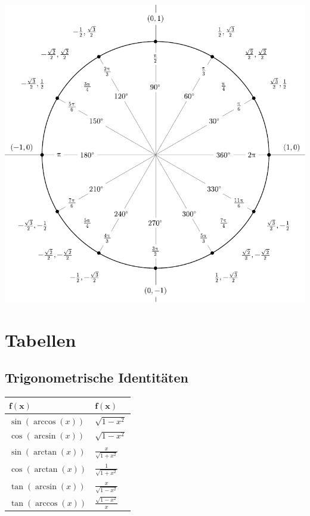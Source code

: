 \documentclass[a4paper,10pt]{article}
\begin{document}
\begin{center}
\includegraphics[width=\linewidth]{degrees_circle.pdf}
\end{center}

\section{Tabellen}

\subsection{Trigonometrische Identitäten}
\begin{center}
 \begin{tabularx}{\linewidth}{>{\centering\arraybackslash}X>{\centering\arraybackslash}X}
  \toprule
  $\mathbf{f(x)}$ & $\mathbf{f(x)}$ \\
  \midrule
  $\sin(\arccos (x))$ & $\sqrt{1-x^2}$\\
  $\cos(\arcsin(x))$ & $\sqrt{1-x^2}$\\
  $\sin(\arctan(x))$ & $\frac{x}{\sqrt{1+x^2}}$\\
  $\cos(\arctan(x))$ & $\frac{1}{\sqrt{1+x^2}}$\\
  $\tan(\arcsin(x))$ & $\frac{x}{\sqrt{1-x^2}}$\\
  $\tan(\arccos(x))$ & $\frac{\sqrt{1-x^2}}{x}$\\
  \bottomrule
 \end{tabularx}
\end{center}
\end{document}
